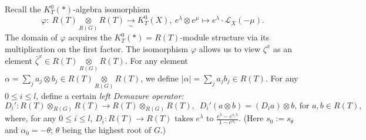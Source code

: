\documentclass{article}
\def\L{\mathcal{L}}
\begin{document}
Recall the $K_T^0(*)$-algebra isomorphism
$$
\varphi: ~ R(T) \underset{R(G)}{\otimes} R(T) \underset{\sim}{\rightarrow} K^0_T (X),~e^\lambda\otimes e^\mu \mapsto e^\lambda \cdot \L_X\left(-\mu\right). 
$$
The domain of $\varphi$ acquires the $K_T^0(*)=R(T)$-module structure via its multiplication on the first factor. 
The isomorphism $\varphi$ allows us to view $\zeta^x$ as an element $\bar{\zeta}^x\in R(T) \underset{R(G)}{\otimes} R(T) $. 
For any element $\alpha=\sum_j a_j \otimes b_j \in R(T) \underset{R(G)}{\otimes} R(T)$, 
we define 
$
\vert \alpha \vert = \sum_j a_j b_j \in R(T).
$
For any $0\leq i \leq l$, define a certain {\it left Demazure operator: }
$$
D_i' : R(T) \otimes_{R(G)} R(T) \rightarrow R(T)\otimes_{R(G)} R(T),
\,\,\,
D_i'\left( a\otimes b\right)=\left(D_i a\right)\otimes b, \,\text{for $a,b\in R(T)$}, 
$$
where, for any $0\leq i\leq l$, 
$
D_i:R(T) \to R(T) \,\,\text{takes $e^\lambda$ to  $\frac{e^\lambda-e^{s_i\lambda}}{1-e^{\alpha_i}}$}.
$ (Here $s_0:=s_\theta$ and $\alpha_0=-\theta$; $\theta$ being the highest root of $G$.)
\end{document}

